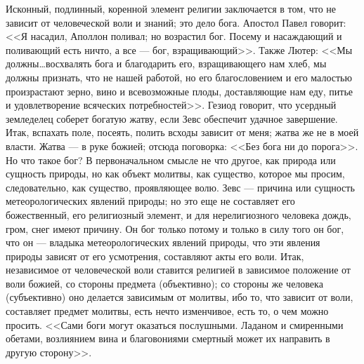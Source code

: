 \documentclass[12pt,oneside]{book}
\begin{document}
Исконный, подлинный, коренной элемент религии заключается в том, что не зависит от человеческой воли и знаний; это дело бога. Апостол Павел говорит: <<Я насадил, Аполлон поливал; но возрастил бог. Посему и насаждающий и поливающий есть ничто, а все --- бог, взращивающий>>. Также Лютер: <<Мы должны\dots восхвалять бога и благодарить его, взращивающего нам хлеб, мы должны признать, что не нашей работой, но его благословением и его малостью произрастают зерно, вино и всевозможные плоды, доставляющие нам еду, питье и удовлетворение всяческих потребностей>>. Гезиод говорит, что усердный земледелец соберет богатую жатву, если Зевс обеспечит удачное завершение. Итак, вспахать поле, посеять, полить всходы зависит от меня; жатва же не в моей власти. Жатва --- в руке божией; отсюда поговорка: <<Без бога ни до порога>>. Но что такое бог? В первоначальном смысле не что другое, как природа или сущность природы, но как объект молитвы, как существо, которое мы просим, следовательно, как существо, проявляющее волю. Зевс --- причина или сущность метеорологических явлений природы; но это еще не составляет его божественный, его религиозный элемент, и для нерелигиозного человека дождь, гром, снег имеют причину. Он бог только потому и только в силу того он бог, что он --- владыка метеорологических явлений природы, что эти явления природы зависят от его усмотрения, составляют акты его воли. Итак, независимое от человеческой воли ставится религией в зависимое положение от воли божией, со стороны предмета (объективно); со стороны же человека (субъективно) оно делается зависимым от молитвы, ибо то, что зависит от воли, составляет предмет молитвы, есть нечто изменчивое, есть то, о чем можно просить. <<Сами боги могут оказаться послушными. Ладаном и смиренными обетами, возлиянием вина и благовониями смертный может их направить в другую сторону>>.

\chapter{}
\end{document}
